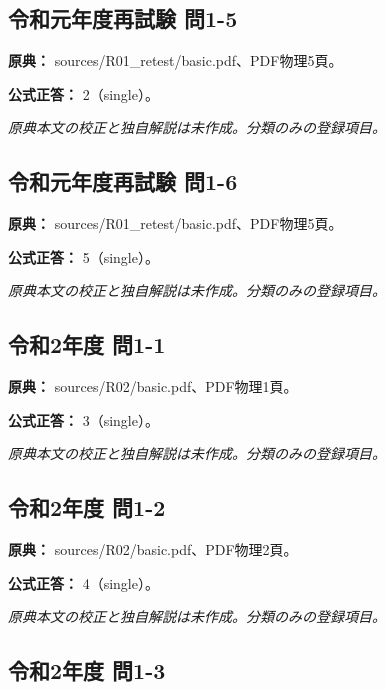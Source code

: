 \subsection{令和元年度再試験 問1-5}
\label{q:r01-ret-basic-1-5}

\noindent\textbf{原典：} sources/R01\_retest/basic.pdf、PDF物理5頁。

\textbf{公式正答：} 2（single）。

\par\textit{原典本文の校正と独自解説は未作成。分類のみの登録項目。}

\subsection{令和元年度再試験 問1-6}
\label{q:r01-ret-basic-1-6}

\noindent\textbf{原典：} sources/R01\_retest/basic.pdf、PDF物理5頁。

\textbf{公式正答：} 5（single）。

\par\textit{原典本文の校正と独自解説は未作成。分類のみの登録項目。}

\subsection{令和2年度 問1-1}
\label{q:r02-reg-basic-1-1}

\noindent\textbf{原典：} sources/R02/basic.pdf、PDF物理1頁。

\textbf{公式正答：} 3（single）。

\par\textit{原典本文の校正と独自解説は未作成。分類のみの登録項目。}

\subsection{令和2年度 問1-2}
\label{q:r02-reg-basic-1-2}

\noindent\textbf{原典：} sources/R02/basic.pdf、PDF物理2頁。

\textbf{公式正答：} 4（single）。

\par\textit{原典本文の校正と独自解説は未作成。分類のみの登録項目。}

\subsection{令和2年度 問1-3}
\label{q:r02-reg-basic-1-3}

